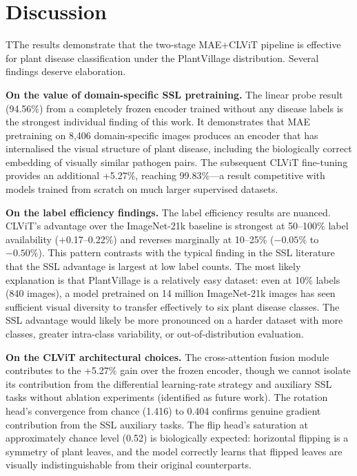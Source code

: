 \documentclass[conference]{IEEEtran}
\begin{document}
\section{Discussion}

TThe results demonstrate that the two-stage MAE+CLViT pipeline is effective for plant disease classification under the PlantVillage distribution. Several findings deserve elaboration.

\textbf{On the value of domain-specific SSL pretraining.} The linear probe result (94.56\%) from a completely frozen encoder trained without any disease labels is the strongest individual finding of this work. It demonstrates that MAE pretraining on 8,406 domain-specific images produces an encoder that has internalised the visual structure of plant disease, including the biologically correct embedding of visually similar pathogen pairs. The subsequent CLViT fine-tuning provides an additional +5.27\%, reaching 99.83\%---a result competitive with models trained from scratch on much larger supervised datasets.

\textbf{On the label efficiency findings.} The label efficiency results are nuanced. CLViT's advantage over the ImageNet-21k baseline is strongest at 50--100\% label availability (+0.17--0.22\%) and reverses marginally at 10--25\% ($-0.05\%$ to $-0.50\%$). This pattern contrasts with the typical finding in the SSL literature that the SSL advantage is largest at low label counts. The most likely explanation is that PlantVillage is a relatively easy dataset: even at 10\% labels (840 images), a model pretrained on 14 million ImageNet-21k images has seen sufficient visual diversity to transfer effectively to six plant disease classes. The SSL advantage would likely be more pronounced on a harder dataset with more classes, greater intra-class variability, or out-of-distribution evaluation.

\textbf{On the CLViT architectural choices.} The cross-attention fusion module contributes to the +5.27\% gain over the frozen encoder, though we cannot isolate its contribution from the differential learning-rate strategy and auxiliary SSL tasks without ablation experiments (identified as future work). The rotation head's convergence from chance (1.416) to 0.404 confirms genuine gradient contribution from the SSL auxiliary tasks. The flip head's saturation at approximately chance level (0.52) is biologically expected: horizontal flipping is a symmetry of plant leaves, and the model correctly learns that flipped leaves are visually indistinguishable from their original counterparts.
\end{document}
